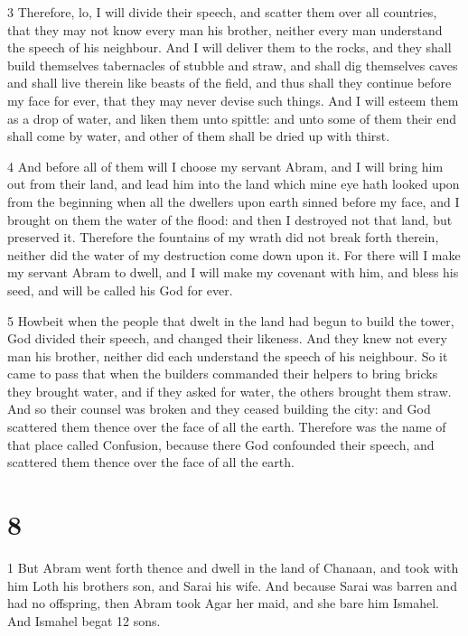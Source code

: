 \par 3 Therefore, lo, I will divide their speech, and scatter them over all countries, that they may not know every man his brother, neither every man understand the speech of his neighbour. And I will deliver them to the rocks, and they shall build themselves tabernacles of stubble and straw, and shall dig themselves caves and shall live therein like beasts of the field, and thus shall they continue before my face for ever, that they may never devise such things. And I will esteem them as a drop of water, and liken them unto spittle: and unto some of them their end shall come by water, and other of them shall be dried up with thirst. 

\par 4 And before all of them will I choose my servant Abram, and I will bring him out from their land, and lead him into the land which mine eye hath looked upon from the beginning when all the dwellers upon earth sinned before my face, and I brought on them the water of the flood: and then I destroyed not that land, but preserved it. Therefore the fountains of my wrath did not break forth therein, neither did the water of my destruction come down upon it. For there will I make my servant Abram to dwell, and I will make my covenant with him, and bless his seed, and will be called his God for ever.

\par 5 Howbeit when the people that dwelt in the land had begun to build the tower, God divided their speech, and changed their likeness. And they knew not every man his brother, neither did each understand the speech of his neighbour. So it came to pass that when the builders commanded their helpers to bring bricks they brought water, and if they asked for water, the others brought them straw. And so their counsel was broken and they ceased building the city: and God scattered them thence over the face of all the earth. Therefore was the name of that place called Confusion, because there God confounded their speech, and scattered them thence over the face of all the earth.

\chapter{8}

\par 1 But Abram went forth thence and dwell in the land of Chanaan, and took with him Loth his brothers son, and Sarai his wife. And because Sarai was barren and had no offspring, then Abram took Agar her maid, and she bare him Ismahel. And Ismahel begat 12 sons.


